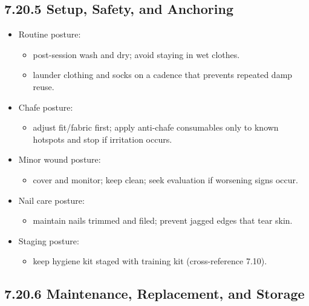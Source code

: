 \documentclass[10pt]{article}
\begin{document}
\subsection*{7.20.5 Setup, Safety, and Anchoring}
{}

\begin{itemize}
\item Routine posture:
  \begin{itemize}
  \item post-session wash and dry; avoid staying in wet clothes.
  \item launder clothing and socks on a cadence that prevents repeated damp reuse.
  \end{itemize}
\item Chafe posture:
  \begin{itemize}
  \item adjust fit/fabric first; apply anti-chafe consumables only to known hotspots and stop if irritation occurs.
  \end{itemize}
\item Minor wound posture:
  \begin{itemize}
  \item cover and monitor; keep clean; seek evaluation if worsening signs occur.
  \end{itemize}
\item Nail care posture:
  \begin{itemize}
  \item maintain nails trimmed and filed; prevent jagged edges that tear skin.
  \end{itemize}
\item Staging posture:
  \begin{itemize}
  \item keep hygiene kit staged with training kit (cross-reference 7.10).
  \end{itemize}
\end{itemize}

\subsection*{7.20.6 Maintenance, Replacement, and Storage}
{}
\end{document}

